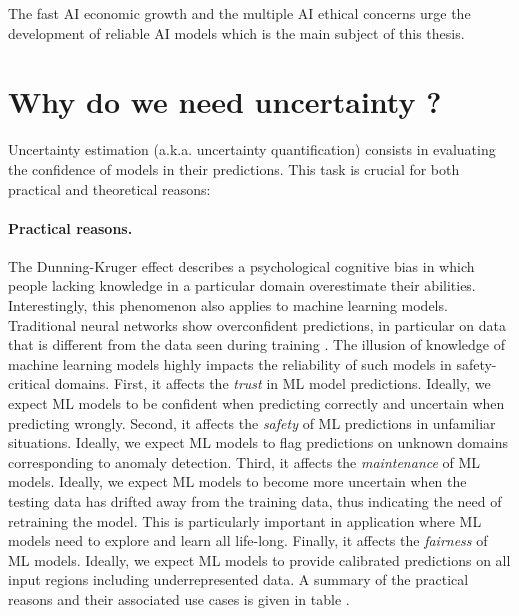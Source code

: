 The fast AI economic growth and the multiple AI ethical concerns urge the development of reliable AI models which is the main subject of this thesis.

\section{Why do we need uncertainty ?}

Uncertainty estimation (a.k.a. uncertainty quantification) consists in evaluating the confidence of models in their predictions. This task is crucial for both practical and theoretical reasons:

\paragraph*{Practical reasons.} The Dunning-Kruger effect \cite{dunning-kruger} describes a psychological cognitive bias in which people lacking knowledge in a particular domain overestimate their abilities. Interestingly, this phenomenon also applies to machine learning models. Traditional neural networks show overconfident predictions, in particular on data that is different from the data seen during training \cite{overconfident-relu}. The illusion of knowledge of machine learning models highly impacts the reliability of such  models  in  safety-critical  domains.
First, it affects the \emph{trust} in ML model predictions. Ideally, we expect ML models to be confident when predicting correctly and uncertain when predicting wrongly. 
Second, it affects the \emph{safety} of ML predictions in unfamiliar situations. Ideally, we expect ML models to flag predictions on unknown domains corresponding to anomaly detection.
Third, it affects the \emph{maintenance} of ML models. Ideally, we expect ML models to become more uncertain when the testing data has drifted away from the training data, thus indicating the need of retraining the model. This is particularly important in application where ML models need to explore and learn all life-long.
Finally, it affects the \emph{fairness} of ML models. Ideally, we expect ML models to provide calibrated predictions on all input regions including underrepresented data.
A summary of the practical reasons and their associated use cases is given in table .

